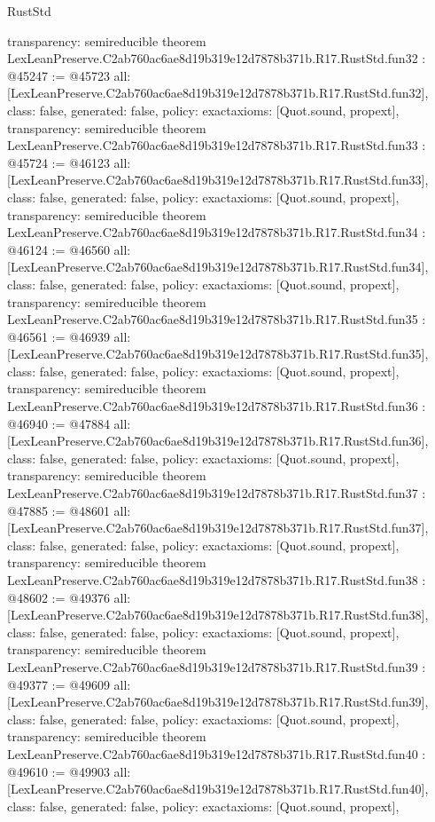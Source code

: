\begin{lexlean}{RustStd}
\begin{coremodule}
{  transparency: semireducible
}
theorem LexLeanPreserve.C2ab760ac6ae8d19b319e12d7878b371b.R17.RustStd.fun32 : @45247 := @45723 {
  all: [LexLeanPreserve.C2ab760ac6ae8d19b319e12d7878b371b.R17.RustStd.fun32],
  class: false,
  generated: false,
  policy: exact{axioms: [Quot.sound, propext]},
  transparency: semireducible
}
theorem LexLeanPreserve.C2ab760ac6ae8d19b319e12d7878b371b.R17.RustStd.fun33 : @45724 := @46123 {
  all: [LexLeanPreserve.C2ab760ac6ae8d19b319e12d7878b371b.R17.RustStd.fun33],
  class: false,
  generated: false,
  policy: exact{axioms: [Quot.sound, propext]},
  transparency: semireducible
}
theorem LexLeanPreserve.C2ab760ac6ae8d19b319e12d7878b371b.R17.RustStd.fun34 : @46124 := @46560 {
  all: [LexLeanPreserve.C2ab760ac6ae8d19b319e12d7878b371b.R17.RustStd.fun34],
  class: false,
  generated: false,
  policy: exact{axioms: [Quot.sound, propext]},
  transparency: semireducible
}
theorem LexLeanPreserve.C2ab760ac6ae8d19b319e12d7878b371b.R17.RustStd.fun35 : @46561 := @46939 {
  all: [LexLeanPreserve.C2ab760ac6ae8d19b319e12d7878b371b.R17.RustStd.fun35],
  class: false,
  generated: false,
  policy: exact{axioms: [Quot.sound, propext]},
  transparency: semireducible
}
theorem LexLeanPreserve.C2ab760ac6ae8d19b319e12d7878b371b.R17.RustStd.fun36 : @46940 := @47884 {
  all: [LexLeanPreserve.C2ab760ac6ae8d19b319e12d7878b371b.R17.RustStd.fun36],
  class: false,
  generated: false,
  policy: exact{axioms: [Quot.sound, propext]},
  transparency: semireducible
}
theorem LexLeanPreserve.C2ab760ac6ae8d19b319e12d7878b371b.R17.RustStd.fun37 : @47885 := @48601 {
  all: [LexLeanPreserve.C2ab760ac6ae8d19b319e12d7878b371b.R17.RustStd.fun37],
  class: false,
  generated: false,
  policy: exact{axioms: [Quot.sound, propext]},
  transparency: semireducible
}
theorem LexLeanPreserve.C2ab760ac6ae8d19b319e12d7878b371b.R17.RustStd.fun38 : @48602 := @49376 {
  all: [LexLeanPreserve.C2ab760ac6ae8d19b319e12d7878b371b.R17.RustStd.fun38],
  class: false,
  generated: false,
  policy: exact{axioms: [Quot.sound, propext]},
  transparency: semireducible
}
theorem LexLeanPreserve.C2ab760ac6ae8d19b319e12d7878b371b.R17.RustStd.fun39 : @49377 := @49609 {
  all: [LexLeanPreserve.C2ab760ac6ae8d19b319e12d7878b371b.R17.RustStd.fun39],
  class: false,
  generated: false,
  policy: exact{axioms: [Quot.sound, propext]},
  transparency: semireducible
}
theorem LexLeanPreserve.C2ab760ac6ae8d19b319e12d7878b371b.R17.RustStd.fun40 : @49610 := @49903 {
  all: [LexLeanPreserve.C2ab760ac6ae8d19b319e12d7878b371b.R17.RustStd.fun40],
  class: false,
  generated: false,
  policy: exact{axioms: [Quot.sound, propext]},
}
\end{coremodule}
\end{lexlean}
